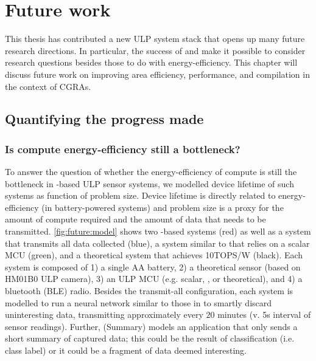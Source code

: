\chapter{Future work}
\label{chapter:future}
This thesis has contributed a new ULP system stack that opens up many future research directions.
% 
In particular, the success of \snafu and \riptide make it possible to consider research questions besides those to do with energy-efficiency.
% 
This chapter will discuss future work on improving area efficiency, performance, and compilation in the context of CGRAs.

\section{Quantifying the progress made}

\figFutureModel
\subsection{Is compute energy-efficiency still a bottleneck?}
To answer the question of whether the energy-efficiency of compute is still the bottleneck in \riptide-based ULP sensor systems, we modelled device lifetime of such systems as function of problem size.
%
Device lifetime is directly related to energy-efficiency (in battery-powered systems) and problem size is a proxy for the amount of compute required and the amount of data that needs to be transmitted.
% 
\autoref{fig:future:model} shows two \riptide-based systems (red) as well as a system that transmits all data collected (blue), a system similar to \sonic that relies on a scalar MCU (green), and a theoretical system that achieves 10TOPS/W (black).
% 
Each system is composed of 1) a single AA battery, 2) a theoretical sensor (based on HM01B0 ULP camera), 3) an ULP MCU (e.g. scalar, \riptide, or theoretical), and 4) a bluetooth (BLE) radio.
% 
Besides the transmit-all configuration, each system is modelled to run a neural network similar to those in \sonic to smartly discard uninteresting data, transmitting approximately every $20$ minutes (v. 5s interval of sensor readings).
% 
Further, \riptide (Summary) models an application that only sends a short summary of captured data; this could be the result of classification (i.e. class label) or it could be a fragment of data deemed interesting.

